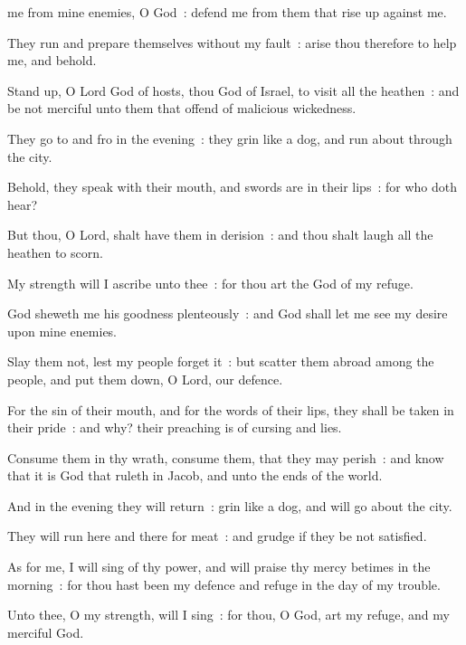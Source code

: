  me from mine enemies, O God~: defend me from them that rise up against me.\par
{}
They run and prepare themselves without my fault~: arise thou therefore to help me, and behold.\par
{}Stand up, O Lord God of hosts, thou God of Israel, to visit all the heathen~: and be not merciful unto them that offend of malicious wickedness.\par
{}They go to and fro in the evening~: they grin like a dog, and run about through the city.\par
{}Behold, they speak with their mouth, and swords are in their lips~: for who doth hear?\par
{}But thou, O Lord, shalt have them in derision~: and thou shalt laugh all the heathen to scorn.\par
{}My strength will I ascribe unto thee~: for thou art the God of my refuge.\par
{}God sheweth me his goodness plenteously~: and God shall let me see my desire upon mine enemies.\par
{}Slay them not, lest my people forget it~: but scatter them abroad among the people, and put them down, O Lord, our defence.\par
{}For the sin of their mouth, and for the words of their lips, they shall be taken in their pride~: and why? their preaching is of cursing and lies.\par
{}Consume them in thy wrath, consume them, that they may perish~: and know that it is God that ruleth in Jacob, and unto the ends of the world.\par
{}And in the evening they will return~: grin like a dog, and will go about the city.\par
{}They will run here and there for meat~: and grudge if they be not satisfied.\par
{}As for me, I will sing of thy power, and will praise thy mercy betimes in the morning~: for thou hast been my defence and refuge in the day of my trouble.\par
{}Unto thee, O my strength, will I sing~: for thou, O God, art my refuge, and my merciful God.\par

